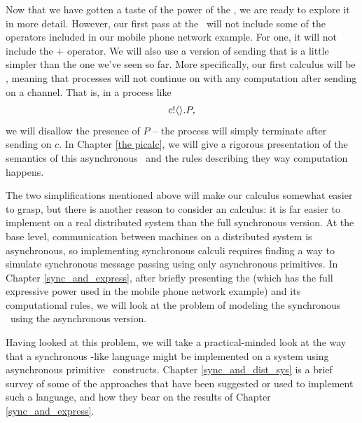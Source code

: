 	Now that we have gotten a taste of the power of the \picalc, we are ready to explore it in more detail.  However, our first pass at the \picalc\ will not include some of the operators included in our mobile phone network example.  For one, it will not include the $+$ operator.  We will also use a version of sending that is a little simpler than the one we've seen so far.  More specifically, our first calculus will be , meaning that processes will not continue on with any computation after sending on a channel.  That is, in a process like
\[
	{c}!\langle{}\rangle.P,
\]
we will disallow the presence of $P$ -- the process will simply terminate after sending on $c$.  In Chapter \ref{the picalc}, we will give a rigorous presentation of the semantics of this asynchronous \picalc\ and the rules describing they way computation happens.

The two simplifications mentioned above will make our calculus somewhat easier to grasp, but there is another reason to consider an  calculus: it is far easier to implement on a real distributed system than the full synchronous version.  At the base level, communication between machines on a distributed system is asynchronous, so implementing synchronous calculi requires finding a way to simulate synchronous message passing using only asynchronous primitives.  In Chapter \ref{sync_and_express}, after briefly presenting the  \picalc (which has the full expressive power used in the mobile phone network example) and its computational rules, we will look at the problem of modeling the synchronous \picalc\ using the asynchronous version.

Having looked at this problem, we will take a practical-minded look at the way that a synchronous \picalc-like language might be implemented on a system using asynchronous primitive \picalc\ constructs. Chapter \ref{sync_and_dist_sys} is a brief survey of some of the approaches that have been suggested or used to implement such a language, and how they bear on the results of Chapter \ref{sync_and_express}.